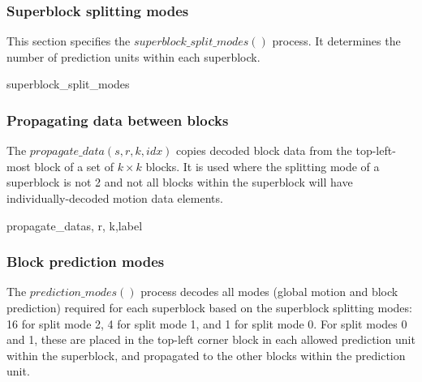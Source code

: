 \subsubsection{Superblock splitting modes}
\label{superblocksplit}

This section specifies the $superblock\_split\_modes()$ process. It determines the number of prediction units
within each superblock.

\begin{pseudo}{superblock\_split\_modes}{}
    \bsEND
\bsEND
{}
\end{pseudo}

\subsubsection{Propagating data between blocks}
\label{propagatedata}

The $propagate\_data(s, r, k,idx)$ copies decoded block data from the top-left-most block
of a set of $k\times k$ blocks. It is used where the splitting mode of a superblock is not 2
 and not all blocks within the superblock will have individually-decoded motion data elements.

\begin{pseudo}{propagate\_data}{s, r, k,label}
        \bsCODE{\BlockData[j][i][label]=\BlockData[s][r][label]}
    \bsEND
\bsEND
\end{pseudo}

\subsubsection{Block prediction modes}
\label{blockpredmodes}

The $prediction\_modes()$ process decodes all modes (global motion and block
 prediction) required for each superblock based on
the superblock splitting modes: 16 for split mode 2, 4 for split mode 1, and 1 for 
split mode 0. For split
modes 0 and 1, these are placed in the top-left corner block in each allowed 
prediction unit within the
superblock, and propagated to the other blocks within the prediction unit.

